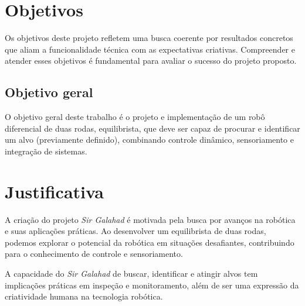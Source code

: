 \section{\textbf{Objetivos}}
Os objetivos deste projeto refletem uma busca coerente por resultados concretos que aliam a funcionalidade técnica com as expectativas criativas. Compreender e atender esses objetivos é fundamental para avaliar o sucesso do projeto proposto.

\subsection{Objetivo geral}
O objetivo geral deste trabalho é o projeto e implementação de um robô diferencial de duas rodas, equilibrista, que deve ser capaz de procurar e identificar um alvo (previamente definido),  combinando controle dinâmico, sensoriamento e integração de sistemas.

\section{\textbf{Justificativa}}

A criação do projeto \textit{Sir Galahad} é motivada pela busca por avanços na robótica e suas aplicações práticas. Ao  desenvolver um equilibrista de duas rodas, podemos explorar o potencial da robótica em situações desafiantes, contribuindo para o conhecimento de controle e sensoriamento.

A capacidade do \textit{Sir Galahad} de buscar, identificar e atingir alvos tem implicações práticas em inspeção e monitoramento, além de ser uma expressão da criatividade humana na tecnologia robótica.

